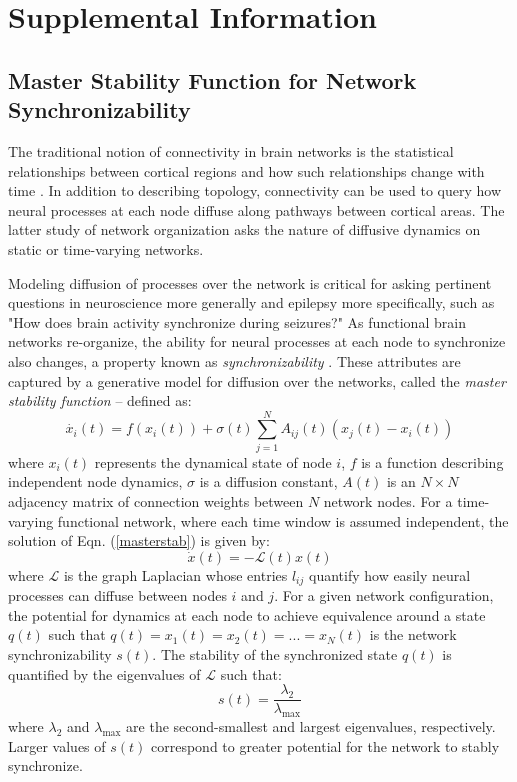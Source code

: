 \section{Supplemental Information}
\subsection{Master Stability Function for Network Synchronizability}
The traditional notion of connectivity in brain networks is the statistical relationships between cortical regions and how such relationships change with time \cite{friston2011functional, hutchison2013dynamic}. In addition to describing topology, connectivity can be used to query how neural processes at each node diffuse along pathways between cortical areas. The latter study of network organization asks the nature of diffusive dynamics on static or time-varying networks. 

Modeling diffusion of processes over the network is critical for asking pertinent questions in neuroscience more generally and epilepsy more specifically, such as "How does brain activity synchronize during seizures?" As functional brain networks re-organize, the ability for neural processes at each node to synchronize also changes, a property known as \textit{synchronizability} \cite{barahona2002synchronization}. These attributes are captured by a generative model for diffusion over the networks, called the \textit{master stability function} \cite{pecora1998master, gomez2013diffusion} -- defined as:
\begin{equation}\label{masterstab}
    \dot{x_i}(t) = f(x_i(t)) + \sigma(t)\sum\limits_{j=1}^{N}A_{ij}(t)(x_j(t) - x_i(t))
\end{equation}
where $x_i(t)$ represents the dynamical state of node $i$, $f$ is a function describing independent node dynamics, $\sigma$ is a diffusion constant, $A(t)$ is an $N \times N$ adjacency matrix of connection weights between $N$ network nodes. For a time-varying functional network, where each time window is assumed independent, the solution of Eqn. (\ref{masterstab}) is given by:
\begin{equation}\label{lapl}
    \dot{x}(t) = -\mathcal{L}(t)x(t)
\end{equation}
where $\mathcal{L}$ is the graph Laplacian whose entries $l_{ij}$ quantify how easily neural processes can diffuse between nodes $i$ and $j$. For a given network configuration, the potential for dynamics at each node to achieve equivalence around a state $q(t)$ such that $q(t)=x_1(t)=x_2(t)=...=x_N(t)$ is the network synchronizability $s(t)$. The stability of the synchronized state $q(t)$ is quantified by the eigenvalues of $\mathcal{L}$ such that:
\begin{equation}\label{sync}
    s(t) = \frac{\lambda_2}{\lambda_\text{max}}
\end{equation}
where $\lambda_2$ and $\lambda_\text{max}$ are the second-smallest and largest eigenvalues, respectively. Larger values of $s(t)$ correspond to greater potential for the network to stably synchronize.   

